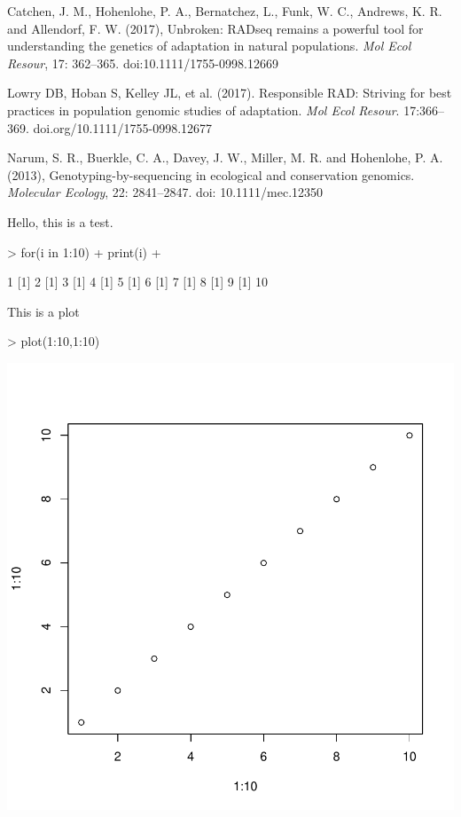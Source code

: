 \documentclass{article}
\begin{document}
Catchen, J. M., Hohenlohe, P. A., Bernatchez, L., Funk, W. C., Andrews, K. R. and Allendorf, F. W. (2017), Unbroken: RADseq remains a powerful tool for understanding the genetics of adaptation in natural populations. \emph{Mol Ecol Resour}, 17: 362–365. doi:10.1111/1755-0998.12669

Lowry DB, Hoban S, Kelley JL, et al. (2017). Responsible RAD: Striving for best practices in population genomic studies of adaptation. \emph{Mol Ecol Resour}. 17:366–369. doi.org/10.1111/1755-0998.12677

Narum, S. R., Buerkle, C. A., Davey, J. W., Miller, M. R. and Hohenlohe, P. A. (2013), Genotyping-by-sequencing in ecological and conservation genomics. \emph{Molecular Ecology}, 22: 2841–2847. doi: 10.1111/mec.12350









Hello, this is a test. 
\begin{Schunk}
\begin{Sinput}
> for(i in 1:10){
+   print(i)
+ }
\end{Sinput}
\begin{Soutput}
[1] 1
[1] 2
[1] 3
[1] 4
[1] 5
[1] 6
[1] 7
[1] 8
[1] 9
[1] 10
\end{Soutput}
\end{Schunk}
This is a plot
\begin{Schunk}
\begin{Sinput}
> plot(1:10,1:10)
\end{Sinput}
\end{Schunk}
\includegraphics{Tutorial_for_RADseq_Tools-008}
\end{document}

